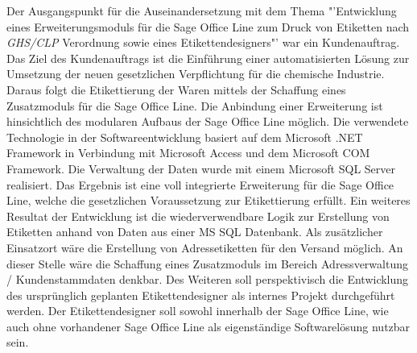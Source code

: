 Der Ausgangspunkt für die Auseinandersetzung mit dem Thema "'Entwicklung  eines  
Erweiterungsmoduls für die  Sage Office Line zum Druck von Etiketten nach \emph{GHS/CLP} 
Verordnung sowie eines Etikettendesigners"' war ein Kundenauftrag. Das Ziel des Kundenauftrags 
ist die Einführung einer automatisierten Lösung zur Umsetzung der neuen gesetzlichen 
Verpflichtung für die chemische Industrie. Daraus folgt die Etikettierung der Waren mittels der 
Schaffung eines Zusatzmoduls für die Sage Office Line.
\newline 
\newline
\noindent
Die Anbindung einer Erweiterung ist hinsichtlich des modularen Aufbaus der Sage Office Line 
möglich. Die verwendete Technologie in der Softwareentwicklung basiert auf dem Microsoft .NET 
Framework in Verbindung mit Microsoft Access und dem Microsoft COM Framework. Die Verwaltung der 
Daten wurde mit einem Microsoft SQL Server realisiert. 
\newline
\newline
\noindent
Das Ergebnis ist eine voll integrierte Erweiterung für die Sage Office Line, welche die 
gesetzlichen Voraussetzung zur Etikettierung erfüllt. Ein weiteres 
Resultat der Entwicklung ist die wiederverwendbare Logik zur Erstellung von Etiketten anhand
von Daten aus einer MS SQL Datenbank. Als zusätzlicher Einsatzort wäre die Erstellung von 
Adressetiketten für den Versand möglich. An dieser Stelle wäre die Schaffung eines Zusatzmoduls im Bereich 
Adressverwaltung / Kundenstammdaten denkbar. Des Weiteren soll perspektivisch die Entwicklung 
des ursprünglich geplanten Etikettendesigner als internes Projekt durchgeführt werden. Der 
Etikettendesigner soll sowohl innerhalb der Sage Office Line, wie auch ohne vorhandener Sage 
Office Line als eigenständige Softwarelösung nutzbar sein.

